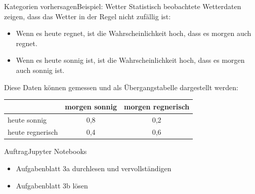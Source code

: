\begin{frame}{Kategorien vorhersagen}{Beispiel: Wetter}
    Statistisch beobachtete Wetterdaten zeigen, dass das Wetter in der Regel nicht zufällig ist:
    \begin{itemize}
        \item Wenn es heute regnet, ist die Wahrscheinlichkeit hoch, dass es morgen auch regnet.
        \item Wenn es heute sonnig ist, ist die Wahrscheinlichkeit hoch, dass es morgen auch sonnig ist.
    \end{itemize}
    Diese Daten können gemessen und als Übergangstabelle dargestellt werden:

    \begin{table}[h]
        \centering
        \begin{tabular}{l|c|c}
            & morgen sonnig & morgen regnerisch \\
            \hline
            heute sonnig     & 0,8 & 0,2 \\
            heute regnerisch & 0,4 & 0,6 \\
        \end{tabular}
    \end{table}
\end{frame}


\begin{frame}{Auftrag}{Jupyter Notebooks}
    \begin{itemize}
        \item Aufgabenblatt 3a durchlesen und vervollständigen
        \item Aufgabenblatt 3b lösen
    \end{itemize}
\end{frame}